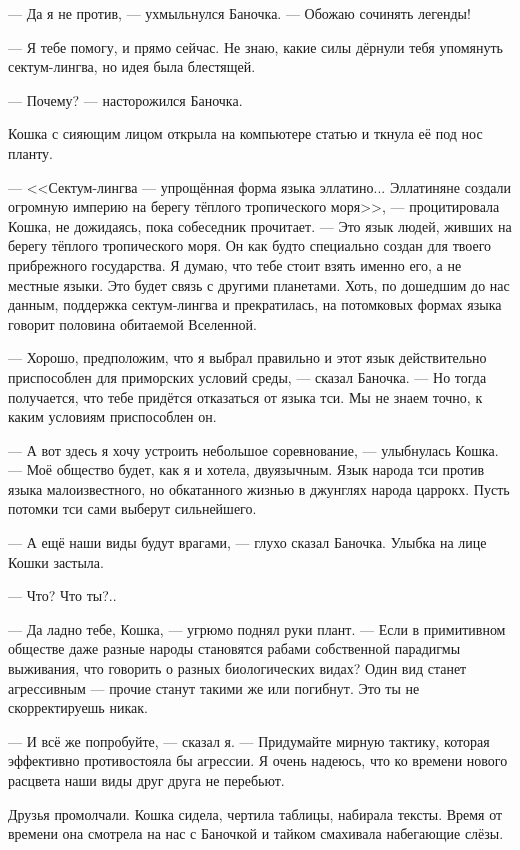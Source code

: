 --- Да я не против, --- ухмыльнулся Баночка.
--- Обожаю сочинять легенды!

--- Я тебе помогу, и прямо сейчас.
Не знаю, какие силы дёрнули тебя упомянуть сектум-лингва, но идея была блестящей.

--- Почему? --- насторожился Баночка.

Кошка с сияющим лицом открыла на компьютере статью и ткнула её под нос планту.

--- <<Сектум-лингва --- упрощённая форма языка эллатино...
Эллатиняне создали огромную империю на берегу тёплого тропического моря>>, --- процитировала Кошка, не дожидаясь, пока собеседник прочитает.
--- Это язык людей, живших на берегу тёплого тропического моря.
Он как будто специально создан для твоего прибрежного государства.
Я думаю, что тебе стоит взять именно его, а не местные языки.
Это будет связь с другими планетами.
Хоть, по дошедшим до нас данным, поддержка сектум-лингва и прекратилась, на потомковых формах языка говорит половина обитаемой Вселенной.

--- Хорошо, предположим, что я выбрал правильно и этот язык действительно приспособлен для приморских условий среды, --- сказал Баночка.
--- Но тогда получается, что тебе придётся отказаться от языка тси.
Мы не знаем точно, к каким условиям приспособлен он.

--- А вот здесь я хочу устроить небольшое соревнование, --- улыбнулась Кошка.
--- Моё общество будет, как я и хотела, двуязычным.
Язык народа тси против языка малоизвестного, но обкатанного жизнью в джунглях народа царрокх.
Пусть потомки тси сами выберут сильнейшего.

--- А ещё наши виды будут врагами, --- глухо сказал Баночка.
Улыбка на лице Кошки застыла.

--- Что?
Что ты?..

--- Да ладно тебе, Кошка, --- угрюмо поднял руки плант.
--- Если в примитивном обществе даже разные народы становятся рабами собственной парадигмы выживания, что говорить о разных биологических видах?
Один вид станет агрессивным --- прочие станут такими же или погибнут.
Это ты не скорректируешь никак.

--- И всё же попробуйте, --- сказал я.
--- Придумайте мирную тактику, которая эффективно противостояла бы агрессии.
Я очень надеюсь, что ко времени нового расцвета наши виды друг друга не перебьют.

Друзья промолчали.
Кошка сидела, чертила таблицы, набирала тексты.
Время от времени она смотрела на нас с Баночкой и тайком смахивала набегающие слёзы.

